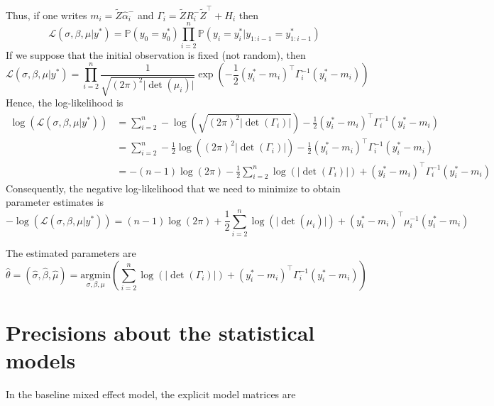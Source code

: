 \documentclass[11pt]{article}
\newcommand {\1}{\mathbb{1}}
\begin{document}
Thus, if one writes $m_i=\tilde{Z} \hat{\alpha}_i^-$ and $\Gamma_i=\tilde{Z} R_i^- \tilde{Z}^\top +H_i$ then 
\[\mathcal{L}(\sigma, \beta, \mu \vert y^*) =\mathbb{P}(y_0=y_0^*) \prod_{i=2}^n \mathbb{P}(y_i=y_i^* \vert y_{1:i-1}=y_{1:i-1}^*)\]
If we suppose that the initial observation is fixed (not random), then
\[\mathcal{L}(\sigma, \beta, \mu \vert y^*) = \prod_{i=2}^n \frac{1}{\sqrt{(2\pi)^2 \vert \det(\mu_i) \vert}} \exp \left( -\frac{1}{2} (y_i^*-m_i)^\top \Gamma_i^{-1} (y_i^*-m_i) \right) \]
Hence, the log-likelihood is 
\begin{align*}
    \log \left(\mathcal{L}(\sigma,\beta,\mu \vert y^*)\right)&=\sum_{i=2}^n -\log(\sqrt{(2\pi)^2 \vert \det(\Gamma_i) \vert}) -\frac{1}{2} (y^*_i-m_i)^\top \Gamma_i^{-1} (y^*_i-m_i)\\
    &=\sum_{i=2}^n -\frac{1}{2}\log\left((2\pi)^2 \vert \det(\Gamma_i) \vert\right) -\frac{1}{2} (y^*_i-m_i)^\top \Gamma_i^{-1} (y^*_i-m_i) \\
    &=-(n-1)\log(2\pi)-\frac{1}{2} \sum_{i=2}^n \log(\vert \det(\Gamma_i) \vert) +(y^*_i-m_i)^\top \Gamma_i^{-1} (y^*_i-m_i)
\end{align*}
Consequently, the negative log-likelihood that we need to minimize to obtain parameter estimates is 
\[
-\log \left(\mathcal{L}(\sigma,\beta,\mu \vert y^*)\right)=(n-1)\log(2\pi)+\frac{1}{2} \sum_{i=2}^n \log(\vert \det(\mu_i) \vert) +(y^*_i-m_i)^\top \mu_i^{-1} (y^*_i-m_i)
\]

The estimated parameters are 
\[\hat{\theta}=(\hat{\sigma},\hat{\beta},\hat{\mu})=\underset{\sigma,\beta,\mu}{\mathrm{argmin}} \left( \sum_{i=2}^n \log(\vert \det(\Gamma_i) \vert) +(y^*_i-m_i)^\top \Gamma_i^{-1} (y^*_i-m_i) \right) \]

\section{Precisions about the statistical models}
\label{section: precisions about statistical models}
In the baseline mixed effect model, the explicit model matrices are 
\end{document}
